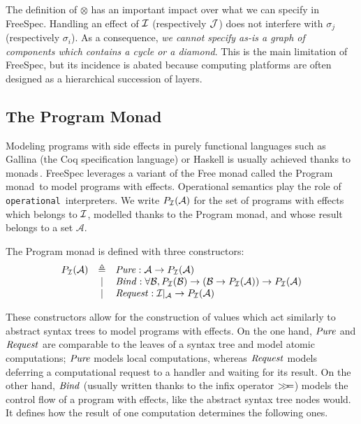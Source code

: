 The definition of $\otimes$ has an important impact over what we can specify in
FreeSpec.
%
%
Handling an effect of $\mathcal{I}$ (respectively $\mathcal{J}$) does not interfere with
$\sigma_j$ (respectively $\sigma_i$).
%
As a consequence, \emph{we cannot specify as-is a graph of components which
  contains a cycle or a diamond}.
%
This is the main limitation of FreeSpec, but its incidence is abated because
computing platforms are often designed as a hierarchical succession of layers.

\subsection{The Program Monad}

Modeling programs with side effects in purely functional languages such as
{\textsc Gallina} (the Coq specification language) or Haskell is usually
achieved thanks to monads\,\cite{hoareetal2001monad}.
%
FreeSpec leverages a variant of the Free monad called the Program
monad\,\cite{operational} to model programs with effects. Operational semantics
play the role of \texttt{operational}\,\cite{operational} interpreters.
%
We write $P_{\mathcal{I}}(\mathcal{A})$ for the set of programs with effects which
belongs to $\mathcal{I}$, modelled thanks to the Program monad, and whose result belongs
to a set $\mathcal{A}$.

\begin{definition}
  The Program monad is defined with three constructors:
  \[
    \begin{array}{rcl}
      P_{\mathcal{I}}(\mathcal{A})
      & \triangleq
      & \mathit{Pure} : \mathcal{A} \rightarrow P_{\mathcal{I}}(\mathcal{A}) \\

      & |
      & \mathit{Bind} : \forall \mathcal{B}, P_{\mathcal{I}}(\mathcal{B}) \rightarrow
        (\mathcal{B} \rightarrow P_{\mathcal{I}}(\mathcal{A})) \rightarrow
        P_{\mathcal{I}}(\mathcal{A}) \\

      & |
      & \mathit{Request} : \mathcal{I}|_{\mathcal{A}} \rightarrow
        P_{\mathcal{I}}(\mathcal{A})
    \end{array}
  \]
\end{definition}
%
These constructors allow for the construction of values which act similarly to
abstract syntax trees to model programs with effects.
%
On the one hand, $\mathit{Pure}$ and $\mathit{Request}$ are comparable to the leaves
of a syntax tree and model atomic computations; $\mathit{Pure}$ models local
computations, whereas $\mathit{Request}$ models deferring a computational request
to a handler and waiting for its result.
%
On the other hand, $\mathit{Bind}$ (usually written thanks to the infix operator
$>\!\!>\!\!=$) models the control flow of a program with effects, like the abstract
syntax tree nodes would.
%
It defines how the result of one computation determines the following ones.

